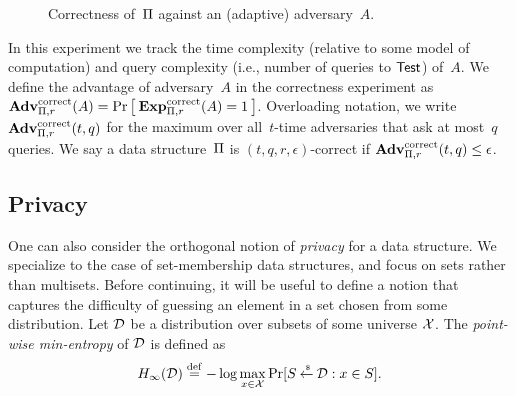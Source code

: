 \begin{figure}[tp]
\centering
{}
\caption{Correctness of~$\Pi$ against an (adaptive) adversary~$A$.}
\label{fig:correctness}
\end{figure}

In this experiment we track the time complexity (relative to some
model of computation) and query complexity (i.e., number of
queries to $\mathsf{Test}$) of~$A$.
We define the advantage of adversary~$A$ in the correctness experiment as
$\mathrm{\mathbf{Adv}}^{\mathrm{correct}}_{\Pi,r}(A) = \Pr\left[\: \mathrm{\mathbf{Exp}}^{\mathrm{correct}}_{\Pi,r}(A)=1 \:\right]$.
 Overloading notation, we write $\mathrm{\mathbf{Adv}}^{\mathrm{correct}}_{\Pi,r}(t,q)$ for the maximum over
all~$t$-time adversaries that ask at most~$q$ queries. We say a
data structure~$\Pi$ is $(t,q,r,\epsilon)$-correct if $\mathrm{\mathbf{Adv}}^{\mathrm{correct}}_{\Pi,r}(t,q) \leq \epsilon$.




\subsection{Privacy}

One can also consider the orthogonal notion of \emph{privacy} for a data structure.
We specialize to the case of set-membership data structures, and
focus on sets rather than multisets. Before continuing, it will be useful to define a notion that captures the difficulty
of guessing an element in a set chosen from some distribution.
Let ${\cal D}$ be a distribution over subsets of some universe ${\cal X}$. The \emph{point-wise
min-entropy} of ${\cal D}$ is defined as
\[H_\infty({\cal D}) \stackrel{\rm def}{=} -\log \max_{x \in {\cal X}} \Pr[S {\:\stackrel{{\scriptscriptstyle \hspace{0.2em}\$}} {\leftarrow}\:} {\cal D} : x \in S].\]

